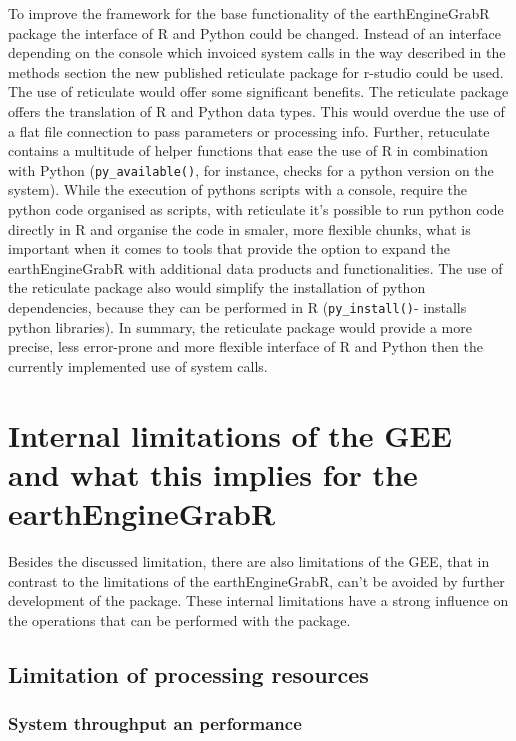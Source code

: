 \documentclass[12pt,twoside,a4paper,final]{report}
\begin{document}
To improve the framework for the base functionality of the earthEngineGrabR package the interface of R and Python could be changed. Instead of an interface depending on the console which invoiced system calls in the way described in the methods section the new published reticulate package for r-studio could be used. The use of reticulate would offer some significant benefits. The reticulate package offers the translation of R and Python data types. This would overdue the use of a flat file connection to pass parameters or processing info. Further, retuculate contains a multitude of helper functions that ease the use of R in combination with Python (\texttt{py\_available()}, for instance, checks for a python version on the system). While the execution of pythons scripts with a console, require the python code organised as scripts, with reticulate it's possible to run python code directly in R and organise the code in smaler, more flexible chunks, what is important when it comes to tools that provide the option to expand the earthEngineGrabR with additional data products and functionalities. The use of the reticulate package also would simplify the installation of python dependencies, because they can be performed in R (\texttt{py\_install()}- installs python libraries).
In summary, the reticulate package would provide a more precise, less error-prone and more flexible interface of R and Python then the currently implemented use of system calls.

\section{Internal limitations of the GEE and what this implies for the earthEngineGrabR}

Besides the discussed limitation, there are also limitations of the GEE, that in contrast to the limitations of the earthEngineGrabR, can't be avoided by further development of the package. These internal limitations have a strong influence on the operations that can be performed with the package. 

\subsection{Limitation of processing resources}


\subsubsection{System throughput an performance}
\end{document}
